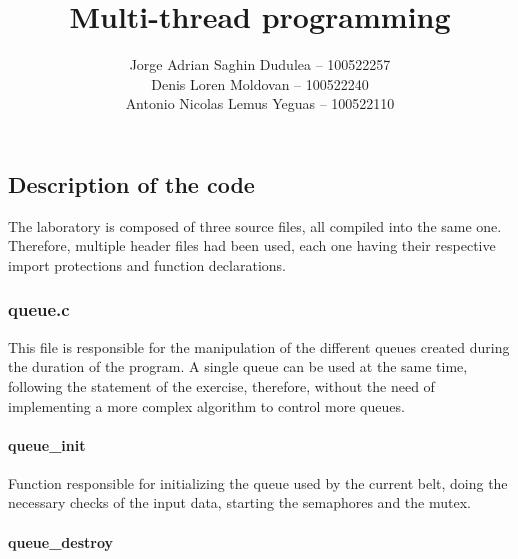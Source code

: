 \documentclass[es]{uc3mreport}
\author{
          Jorge Adrian Saghin Dudulea -- 100522257
      \\
          Denis Loren Moldovan -- 100522240
      \\
          Antonio Nicolas Lemus Yeguas -- 100522110
      }
\title{Multi-thread programming}
\begin{document}
    \makecover

    \tableofcontents

    \begin{report}

      \part{Description of the code}

      \setcounter{section}{0}

      \setcounter{subsection}{0}

      \setcounter{subsubsection}{0}

      The laboratory is composed of three source files, all compiled
      into the same one. Therefore, multiple header files had been used,
      each one having their respective import protections and function
      declarations.

      \section{queue.c}

      \setcounter{subsection}{0}

      \setcounter{subsubsection}{0}

      This file is responsible for the manipulation of the different
      queues created during the duration of the program. A single queue
      can be used at the same time, following the statement of the
      exercise, therefore, without the need of implementing a more
      complex algorithm to control more queues.

      \subsection{queue\_init}

      \setcounter{subsubsection}{0}

      Function responsible for initializing the queue used by the
      current belt, doing the necessary checks of the input data,
      starting the semaphores and the mutex.

      \subsection{queue\_destroy}

      \setcounter{subsubsection}{0}


\end{report}
\end{document}
